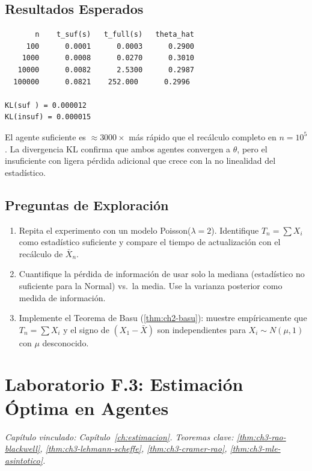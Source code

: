 \subsection*{Resultados Esperados}

\begin{verbatim}
       n    t_suf(s)   t_full(s)   theta_hat
     100      0.0001      0.0003      0.2900
    1000      0.0008      0.0270      0.3010
   10000      0.0082      2.5300      0.2987
  100000      0.0821    252.000      0.2996

KL(suf ) = 0.000012
KL(insuf) = 0.000015
\end{verbatim}

El agente suficiente es $\approx 3000\times$ más rápido que el recálculo
completo en $n=10^5$. La divergencia KL confirma que ambos agentes convergen
a $\theta$, pero el insuficiente con ligera pérdida adicional que crece
con la no linealidad del estadístico.

\subsection*{Preguntas de Exploración}

\begin{enumerate}
    \item Repita el experimento con un modelo Poisson($\lambda=2$).
          Identifique $T_n = \sum X_i$ como estadístico suficiente y compare
          el tiempo de actualización con el recálculo de $\bar X_n$.
    \item Cuantifique la pérdida de información de usar solo la mediana
          (estadístico no suficiente para la Normal) vs.\ la media.
          Use la varianza posterior como medida de información.
    \item Implemente el Teorema de Basu (\ref{thm:ch2-basu}): muestre
          empíricamente que $T_n = \sum X_i$ y el signo de $(X_1 - \bar X)$
          son independientes para $X_i \sim N(\mu, 1)$ con $\mu$ desconocido.
\end{enumerate}

\section{Laboratorio F.3: Estimación Óptima en Agentes}
\label{lab:F3}
\textit{Capítulo vinculado: Capítulo~\ref{ch:estimacion}.
Teoremas clave: \ref{thm:ch3-rao-blackwell}, \ref{thm:ch3-lehmann-scheffe},
\ref{thm:ch3-cramer-rao}, \ref{thm:ch3-mle-asintotico}.}

